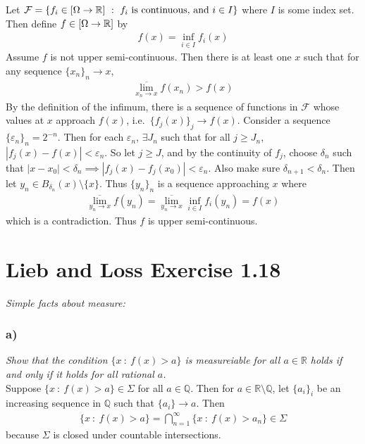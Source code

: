 \documentclass[12pt]{article}
\newcommand{\E}{\varepsilon}
\theoremstyle{plain}
\begin{document}
Let $\mathcal{F} = \{f_i \in \qty[\Omega \rightarrow \mathbb{R}]\ :\ f_i \text{ is continuous, and } i \in I\}$ where $I$ is some index set.  Then define $f \in \qty[\Omega \rightarrow \mathbb{R}]$ by
\begin{align*}
    f(x) = \inf_{i \in I}f_i(x)
\end{align*}
Assume $f$ is not upper semi-continuous.  Then there is at least one $x$ such that for any sequence $\{x_n\}_n \rightarrow x$,
\begin{align*}
    \overline{\lim_{x_n \rightarrow x}} f(x_n) > f(x)
\end{align*}
By the definition of the infimum, there is a sequence of functions in $\mathcal{F}$ whose values at $x$ approach $f(x)$, i.e.~$\{f_j(x)\}_j \rightarrow f(x)$.  Consider a sequence $\{\E_n\}_n = 2^{-n}$.  Then for each $\E_n$, $\exists J_n$ such that for all $j \geq J_n$, $|f_j(x) - f(x)| < \E_n$.  So let $j \geq J$, and by the continuity of $f_j$, choose $\delta_n$ such that $|x - x_0| < \delta_n \implies |f_j(x) - f_j(x_0)| < \E_n$.  Also make sure $\delta_{n+1} < \delta_n$.  Then let $y_n \in B_{\delta_n}(x)\setminus\{x\}$.  Thus $\{y_n\}_n$ is a sequence approaching $x$ where
\begin{align*}
    \overline{\lim_{y_n\rightarrow x}}f(y_n) = \overline{\lim_{y_n\rightarrow x}}\inf_{i\in I}f_i(y_n) = f(x)
\end{align*}
which is a contradiction.  Thus $f$ is upper semi-continuous.

\section*{Lieb and Loss Exercise 1.18}
\emph{Simple facts about measure:}

\subsubsection*{ a)}
\emph{Show that the condition $\{x\ :\ f(x) > a\}$ is measureiable for all $a \in \mathbb{R}$ holds if and only if it holds for all rational $a$.} \\

Suppose $\{x\ :\ f(x) > a\} \in \Sigma$ for all $a \in \mathbb{Q}$.  Then for $a \in \mathbb{R} \setminus \mathbb{Q}$, let $\{a_i\}_i$ be an increasing sequence in $\mathbb{Q}$ such that $\{a_i\} \rightarrow a$.  Then
\begin{align*}
    \{x\ :\ f(x) > a\} = \bigcap_{n=1}^\infty\{x\ :\ f(x) > a_n\} \in \Sigma
\end{align*}
because $\Sigma$ is closed under countable intersections.
\end{document}
